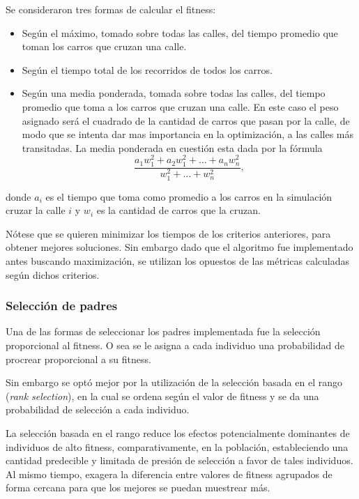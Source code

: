 \documentclass[colorinlistoftodos,twoside,twocolumn]{article} %
\begin{document}
	Se consideraron tres formas de calcular el fitness:
	\begin{itemize}
		\item Seg\'un el m\'aximo, tomado sobre todas las calles, del tiempo promedio que toman los carros que cruzan una calle. 
		\item Seg\'un el tiempo total de los recorridos de todos los carros. 
		\item Seg\'un una media ponderada, tomada sobre todas las calles, del tiempo promedio que toma a los carros que cruzan una calle. En este caso el peso asignado ser\'a el cuadrado de la cantidad de carros que pasan por la calle, de modo que se intenta dar mas importancia en la optimizaci\'on, a las calles m\'as transitadas. La media ponderada en cuesti\'on esta dada por la f\'ormula
		\[ \frac{a_1w_1^2 + a_2w_1^2 + \dots + a_nw_n^2}{w_1^2 + \dots + w_n^2},\]
	\end{itemize}

	donde $a_i$ es el tiempo que toma como promedio a los carros en la simulaci\'on cruzar la calle $i$ y $w_i$ es la cantidad de carros que la cruzan.

	N\'otese que se quieren minimizar los tiempos de los criterios anteriores, para obtener mejores soluciones. Sin embargo dado que el algoritmo fue implementado antes buscando maximizaci\'on, se utilizan los opuestos de las m\'etricas calculadas seg\'un dichos criterios.
	
	\subsubsection{Selección de padres}
	Una de las formas de seleccionar los padres implementada fue la selecci\'on proporcional al fitness. O sea se le asigna a cada individuo una probabilidad de procrear proporcional a su fitness.
	
	Sin embargo se opt\'o mejor por la utilizaci\'on de la selección basada en el rango (\textit{rank selection}), en la cual se ordena según el valor de fitness y se da una probabilidad de selección a cada individuo. 
	
	La selección basada en el rango reduce los efectos potencialmente dominantes de individuos de alto fitness, comparativamente, en la población, estableciendo una cantidad predecible y limitada de presión de selección a favor de tales individuos. Al mismo tiempo, exagera la diferencia entre valores de fitness agrupados de forma cercana para que los mejores se puedan muestrear más.
	
\end{document}
